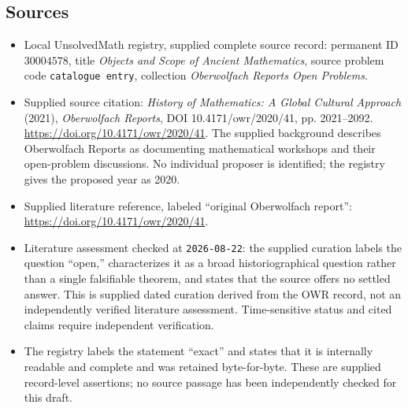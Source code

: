 \documentclass[11pt]{article}
\begin{document}
\subsection{Sources}
\begin{itemize}
\item Local UnsolvedMath registry, supplied complete source record: permanent ID \(30004578\), title \emph{Objects and Scope of Ancient Mathematics}, source problem code \texttt{catalogue entry}, collection \emph{Oberwolfach Reports Open Problems}.
\item Supplied source citation: \emph{History of Mathematics: A Global Cultural Approach} (2021), \emph{Oberwolfach Reports}, DOI 10.4171/owr/2020/41, pp. 2021--2092. \url{https://doi.org/10.4171/owr/2020/41}. The supplied background describes Oberwolfach Reports as documenting mathematical workshops and their open-problem discussions. No individual proposer is identified; the registry gives the proposed year as 2020.
\item Supplied literature reference, labeled ``original Oberwolfach report'': \url{https://doi.org/10.4171/owr/2020/41}.
\item Literature assessment checked at \texttt{2026-08-22}: the supplied curation labels the question ``open,'' characterizes it as a broad historiographical question rather than a single falsifiable theorem, and states that the source offers no settled answer. This is supplied dated curation derived from the OWR record, not an independently verified literature assessment. Time-sensitive status and cited claims require independent verification.
\item The registry labels the statement ``exact'' and states that it is internally readable and complete and was retained byte-for-byte. These are supplied record-level assertions; no source passage has been independently checked for this draft.
\end{itemize}
\end{document}
